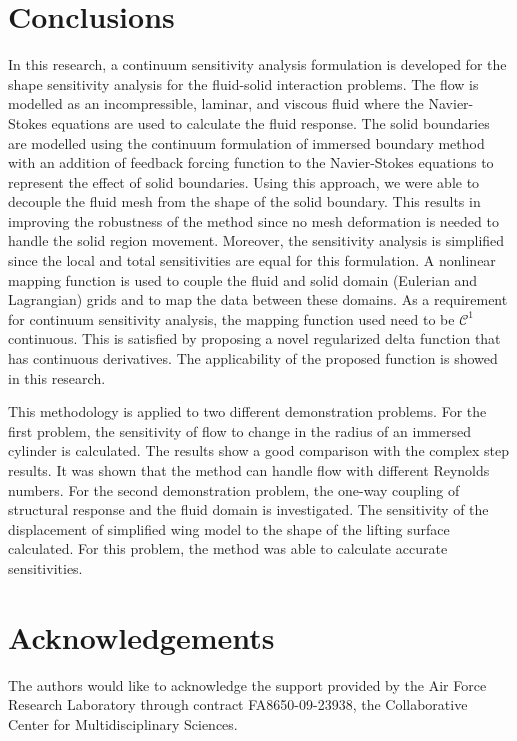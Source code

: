 \documentclass[12pt]{aiaa-pretty}
\begin{document}
\section{Conclusions}
In this research, a continuum sensitivity analysis formulation is developed for the shape sensitivity analysis for the fluid-solid interaction problems. The flow is modelled as an incompressible, laminar, and viscous fluid where the Navier-Stokes equations are used to calculate the fluid response. The solid boundaries are modelled using the continuum formulation of immersed boundary method with an addition of feedback forcing function to the Navier-Stokes equations to represent the effect of solid boundaries. Using this approach, we were able to decouple the fluid mesh from the shape of the solid boundary. This results in improving the robustness of the method since no mesh deformation is needed to handle the solid region movement. Moreover, the sensitivity analysis is simplified since the local and total sensitivities are equal for this formulation. A nonlinear mapping function is used to couple the fluid and solid domain (Eulerian and Lagrangian) grids and to map the data between these domains. As a requirement for continuum sensitivity analysis, the mapping function used need to be $\mathcal{C}^1$ continuous. This is satisfied by proposing a novel regularized delta function that has continuous derivatives. The applicability of the proposed function is showed in this research.

This methodology is applied to two different demonstration problems. For the first problem, the sensitivity of flow to change in the radius of an immersed cylinder is calculated. The results show a good comparison with the complex step results. It was shown that the method can handle flow with different Reynolds numbers. For the second demonstration problem, the one-way coupling of structural response and the fluid domain is investigated. The sensitivity of the displacement of simplified wing model to the shape of the lifting surface calculated. For this problem, the method was able to calculate accurate sensitivities.
\section*{Acknowledgements}
The authors would like to acknowledge the support provided by the Air Force Research Laboratory through contract FA8650-09-23938, the Collaborative Center for Multidisciplinary Sciences.


\end{document}
